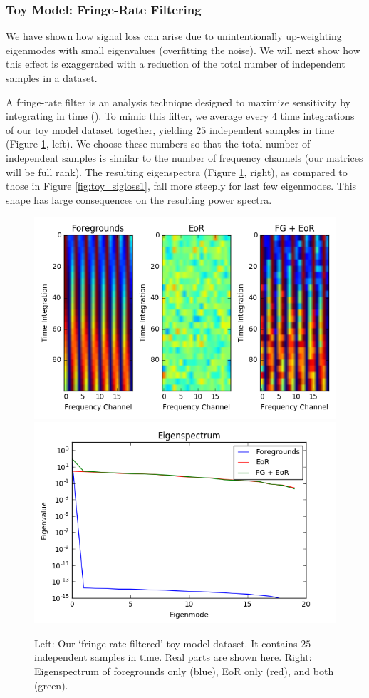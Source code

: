 \documentclass[preprint2,numberedappendix,tighten,twocolappendix]{aastex6}  %
\begin{document}
\subsubsection{Toy Model: Fringe-Rate Filtering}

We have shown how signal loss can arise due to unintentionally up-weighting eigenmodes with small eigenvalues (overfitting the noise). We will next show how this effect is exaggerated with a reduction of the total number of independent samples in a dataset. 

A fringe-rate filter is an analysis technique designed to maximize sensitivity by integrating in time (\citealt{parsons_et_al2016}). To mimic this filter, we average every $4$ time integrations of our toy model dataset together, yielding $25$ independent samples in time (Figure \ref{fig:toy_sigloss5}, left). We choose these numbers so that the total number of independent samples is similar to the number of frequency channels (our matrices will be full rank). The resulting eigenspectra (Figure \ref{fig:toy_sigloss5}, right), as compared to those in Figure \ref{fig:toy_sigloss1}, fall more steeply for last few eigenmodes. This shape has large consequences on the resulting power spectra.

\begin{figure}
	\centering
	\includegraphics[trim={0.3cm 0.2cm 0.3cm 0.3cm},clip,height=0.3\textwidth]{plots/toy_sigloss5.png}
	\includegraphics[trim={0.3cm 0.2cm 0.3cm 0.3cm},clip,height=0.3\textwidth]{plots/toy_sigloss6.png}
	\caption{Left: Our `fringe-rate filtered' toy model dataset. It contains $25$ independent samples in time. Real parts are shown here. Right: Eigenspectrum of foregrounds only (blue), EoR only (red), and both (green).}
	\label{fig:toy_sigloss5}
\end{figure}
\end{document}
